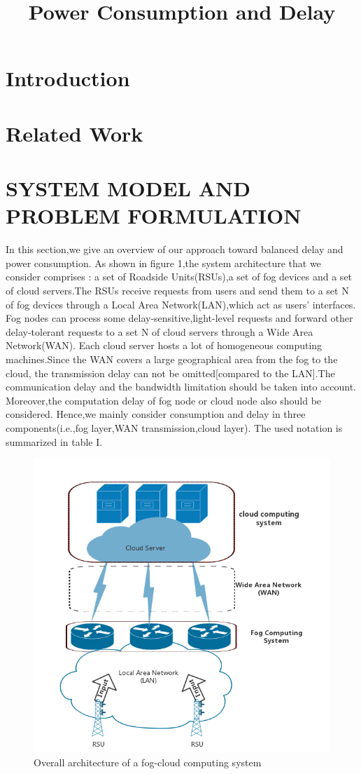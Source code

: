 \documentclass[twoside,twocolumn]{article}
\title{Power Consumption and Delay}
\author{}  %
\begin{document}
\maketitle
\section{Introduction}
\section{Related Work}
\section{SYSTEM MODEL AND PROBLEM FORMULATION}
In this section,we give an overview of our approach toward balanced delay and power consumption. As shown in figure 1,the system architecture that we consider comprises : a set of Roadside Units(RSUs),a set of fog devices and a set of cloud servers.The RSUs receive requests from users and send them to a set N of fog devices through a Local Area Network(LAN),which act as users' interfaces. Fog nodes can process some delay-sensitive,light-level requests and forward other delay-tolerant requests to a set N of cloud servers through a Wide Area Network(WAN). Each cloud server hosts a lot of homogeneous computing machines.Since the WAN covers a large geographical area from the fog to the cloud, the transmission delay can not be omitted[compared to the LAN].The communication delay and the bandwidth limitation should be taken into account. Moreover,the computation delay of fog node or cloud node also should be considered. Hence,we mainly consider consumption and delay in three components(i.e.,fog layer,WAN transmission,cloud layer). The used notation is summarized in table I.
\begin{figure}[h]
\centering
\includegraphics[scale=0.3]{3.png}
\caption{Overall architecture of a fog-cloud computing system}
\label{fig:label}
\end{figure}
\end{document}

